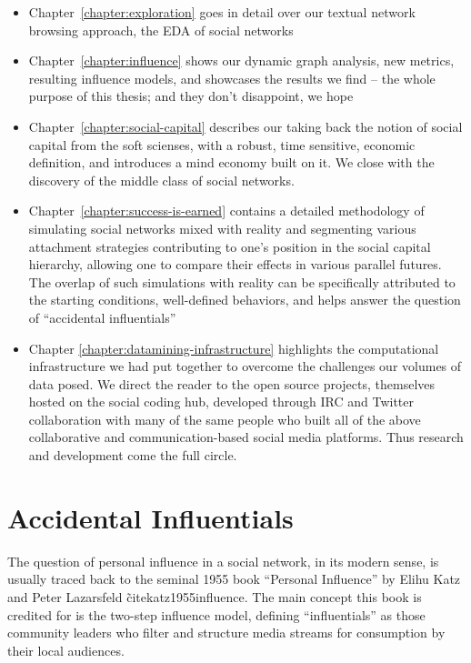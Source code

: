 \documentclass[10pt,oneside]{memoir}
\begin{document}
\begin{itemize}


\item Chapter~\ref{chapter:exploration} goes in detail over our textual network browsing approach, the EDA of social networks

\item Chapter~\ref{chapter:influence} shows our dynamic graph analysis, new metrics, resulting influence models, and showcases the results we find -- the whole purpose of this thesis; and they don't disappoint, we hope

\item Chapter~\ref{chapter:social-capital} describes our taking back the notion of social capital from the soft scienses, with a robust, time sensitive, economic definition, and introduces a mind economy built on it.  We close with the discovery of the middle class of social networks.

\item Chapter~\ref{chapter:success-is-earned} contains a detailed methodology of simulating social networks mixed with reality and segmenting various attachment strategies contributing to one's position in the social capital hierarchy, allowing one to compare their effects in various parallel futures.  The overlap of such simulations with reality can be specifically attributed to the starting conditions, well-defined behaviors, and helps answer the question of ``accidental influentials''

\item Chapter \ref{chapter:datamining-infrastructure} highlights the computational infrastructure we had put together to overcome the challenges our volumes of data posed.  We direct the reader to the open source projects, themselves hosted on the social coding hub, developed through IRC and Twitter collaboration with many of the same people who built all of the above collaborative and communication-based social media platforms.  Thus research and development come the full circle.
\end{itemize}

\pagebreak \chapter{Accidental Influentials}
\label{accidentalinfluentials}

The question of personal influence in a social network, in its modern sense, is usually traced back to the seminal 1955 book ``Personal Influence'' by Elihu Katz and Peter Lazarsfeld \~cite{katz1955influence}.  The main concept this book is credited for is the two-step influence model, defining ``influentials'' as those community leaders who filter and structure media streams for consumption by their local audiences.
\end{document}
